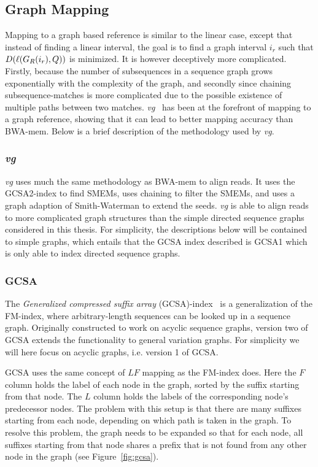 \subsection{Graph Mapping}
\label{sec:graphmapping}
Mapping to a graph based reference is similar to the linear case, except that instead of finding a linear interval, the goal is to find a graph interval $i_r$ such that $D(\ell(G_R(i_r), Q))$ is minimized.
It is however deceptively more complicated. 
Firstly, because the number of subsequences in a sequence graph grows exponentially with the complexity of the graph, and secondly since chaining subsequence-matches is more complicated due to the possible existence of multiple paths between two matches.
\emph{vg}~\cite{vg} has been at the forefront of mapping to a graph reference, showing that it can lead to better mapping accuracy than BWA-mem.
Below is a brief description of the methodology used by \emph{vg}.

\subsubsection{\emph{vg}}
\emph{vg} uses much the same methodology as BWA-mem to align reads.
It uses the GCSA2-index to find SMEMs, uses chaining to filter the SMEMs, and uses a graph adaption of Smith-Waterman to extend the seeds.
\emph{vg} is able to align reads to more complicated graph structures than the simple directed sequence graphs considered in this thesis.
For simplicity, the descriptions below will be contained to simple graphs, which entails that the GCSA index described is GCSA1\cite{gcsa1} which is only able to index directed sequence graphs.

\subsubsection{GCSA}
The \emph{Generalized compressed suffix array} (GCSA)-index~\cite{gcsa1, gcsa2} is a generalization of the FM-index, where arbitrary-length sequences can be looked up in a sequence graph.
Originally constructed to work on acyclic sequence graphs, version two of GCSA extends the functionality to general variation graphs.
For simplicity we will here focus on acyclic graphs, i.e. version 1 of GCSA.

GCSA uses the same concept of $LF$ mapping as the FM-index does.
Here the $F$ column holds the label of each node in the graph, sorted by the suffix starting from that node.
The $L$ column holds the labels of the corresponding node's predecessor nodes.
The problem with this setup is that there are many suffixes starting from each node, depending on which path is taken in the graph.
To resolve this problem, the graph needs to be expanded so that for each node, all suffixes starting from that node shares a prefix that is not found from any other node in the graph (see Figure~\ref{fig:gcsa}).

